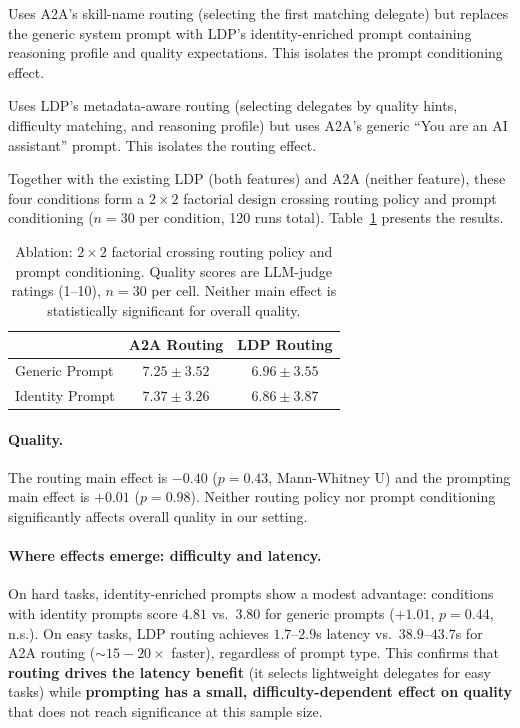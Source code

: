 \documentclass[11pt,a4paper]{article}
\newcommand{\ldp}{\textsc{LDP}}
\newcommand{\atoa}{\textsc{A2A}}
\begin{document}
\begin{description}[leftmargin=0pt]
\item[A2A + LDP prompt.] Uses \atoa{}'s skill-name routing (selecting the first matching delegate) but replaces the generic system prompt with \ldp{}'s identity-enriched prompt containing reasoning profile and quality expectations. This isolates the prompt conditioning effect.
\item[LDP routing + generic prompt.] Uses \ldp{}'s metadata-aware routing (selecting delegates by quality hints, difficulty matching, and reasoning profile) but uses \atoa{}'s generic ``You are an AI assistant'' prompt. This isolates the routing effect.
\end{description}

Together with the existing \ldp{} (both features) and \atoa{} (neither feature), these four conditions form a $2 \times 2$ factorial design crossing routing policy and prompt conditioning ($n{=}30$ per condition, 120 runs total). Table~\ref{tab:ablation} presents the results.

\begin{table}[t]
\centering
\caption{Ablation: $2 \times 2$ factorial crossing routing policy and prompt conditioning. Quality scores are LLM-judge ratings (1--10), $n{=}30$ per cell. Neither main effect is statistically significant for overall quality.}
\label{tab:ablation}
\begin{tabular}{lcc}
\toprule
& A2A Routing & LDP Routing \\
\midrule
Generic Prompt & $7.25 \pm 3.52$ & $6.96 \pm 3.55$ \\
Identity Prompt & $7.37 \pm 3.26$ & $6.86 \pm 3.87$ \\
\bottomrule
\end{tabular}
\end{table}

\paragraph{Quality.} The routing main effect is $-0.40$ ($p{=}0.43$, Mann-Whitney U) and the prompting main effect is $+0.01$ ($p{=}0.98$). Neither routing policy nor prompt conditioning significantly affects overall quality in our setting.

\paragraph{Where effects emerge: difficulty and latency.} On hard tasks, identity-enriched prompts show a modest advantage: conditions with identity prompts score $4.81$ vs.\ $3.80$ for generic prompts ($+1.01$, $p{=}0.44$, n.s.). On easy tasks, LDP routing achieves $1.7$--$2.9$s latency vs.\ $38.9$--$43.7$s for A2A routing (${\sim}15{-}20\times$ faster), regardless of prompt type. This confirms that \textbf{routing drives the latency benefit} (it selects lightweight delegates for easy tasks) while \textbf{prompting has a small, difficulty-dependent effect on quality} that does not reach significance at this sample size.
\end{document}
